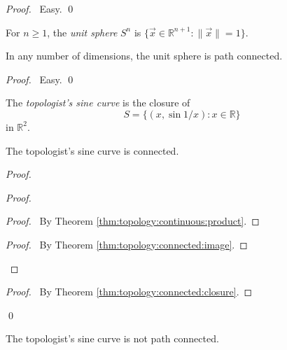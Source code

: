 \begin{proof}
  \pf\ Easy. \qed
\end{proof}

\begin{df}
  For $n \geq 1$, the \emph{unit sphere} $S^n$ is $\{ \vec{x} \in
  \mathbb{R}^{n+1} : \| \vec{x} \| = 1 \}$.
\end{df}

\begin{prop}
  In any number of dimensions, the unit sphere is path connected.
\end{prop}

\begin{proof}
  \pf\ Easy. \qed
\end{proof}

\begin{df}
  The \emph{topologist's sine curve} is the closure of
  \[ S = \{ (x, \sin 1/x) : x \in \mathbb{R} \} \]
  in $\mathbb{R}^2$.
\end{df}

\begin{prop}
  The topologist's sine curve is connected.
\end{prop}

\begin{proof}
  \pf
  \begin{proof}
    \begin{proof}
      \pf\ By Theorem \ref{thm:topology:continuous:product}.
    \end{proof}
    \qedstep
    \begin{proof}
      \pf\ By Theorem \ref{thm:topology:connected:image}.
    \end{proof}
  \end{proof}
  \qedstep
  \begin{proof}
    \pf\ By Theorem \ref{thm:topology:connected:closure}.
  \end{proof}
  \qed
\end{proof}

\begin{prop}[CC]
  The topologist's sine curve is not path connected.
\end{prop}

